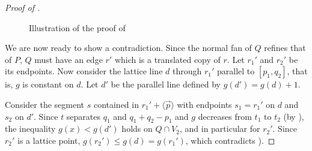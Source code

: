 \documentclass{amsart}
\theoremstyle{plain}
\theoremstyle{definition}
\renewcommand{\vec}[1]{\overrightarrow#1}
\newcommand{\vecline}[1]{\langle \vec #1 \rangle}
\newcommand{\giulia}[1]{\todo[size=\tiny,color=blue!30]{#1 \\ \hfill --- G.}}
\begin{document}
\begin{proof}[Proof of ]
\begin{figure}[htb]
\scalebox{.75}{}
\caption{Illustration of the proof of }
\label{fig:claim4}
\end{figure}


We are now ready to show a contradiction. Since the normal fan of $Q$ refines that of $P$, $Q$ must have an edge $r'$ which is a translated copy of $r$. Let $r_1'$ and $r_2'$ be its endpoints. Now consider the lattice line $d$ through $r_1'$ parallel to  $[p_1, q_2]$, that is, $g$ is constant on $d$. Let $d'$ be the parallel line defined by $g(d')=g(d)+1$. 


Consider the segment $s$ contained in $r_1' + \vecline p$ with endpoints $s_1=r_1'$ on $d$ and $s_2$ on $d'$.  
Since $t$ separates $q_1$ and $q_1+q_2-p_1$ and $g$ decreases from $t_1$ to $t_2$ (by ), the inequality $g(x)< g(d')$ holds on $Q\cap V_2$,
and in particular for $r_2'$. Since $r_2'$ is a lattice point, $g(r_2')\leq g(d)= g(r_1')$, which contradicts ).
\end{proof}
\giulia{add a picture!}
\end{document}

